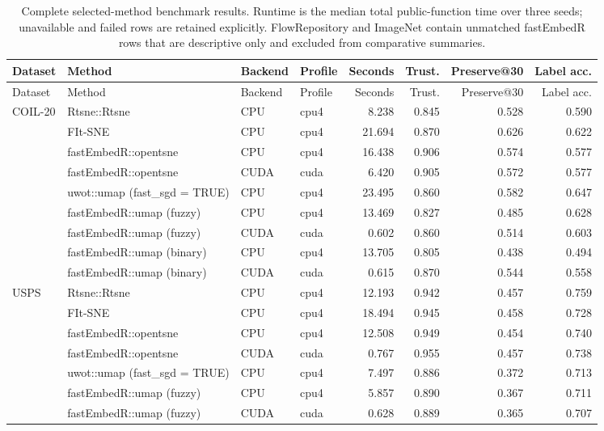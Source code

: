 {\scriptsize
\setlength{\tabcolsep}{2.2pt}
\begin{longtable}{p{}p{}llrrrr}
\caption{Complete selected-method benchmark results. Runtime is the median total public-function time over three seeds; unavailable and failed rows are retained explicitly. FlowRepository and ImageNet contain unmatched fastEmbedR rows that are descriptive only and excluded from comparative summaries.}\label{tab:allselected}\\
\toprule
Dataset & Method & Backend & Profile & Seconds & Trust. & Preserve@30 & Label acc.\\
\midrule
\endfirsthead
\toprule
Dataset & Method & Backend & Profile & Seconds & Trust. & Preserve@30 & Label acc.\\
\midrule
\endhead
COIL-20 & Rtsne::Rtsne & CPU & cpu4 & 8.238 & 0.845 & 0.528 & 0.590\\
 & FIt-SNE & CPU & cpu4 & 21.694 & 0.870 & 0.626 & 0.622\\
 & fastEmbedR::opentsne & CPU & cpu4 & 16.438 & 0.906 & 0.574 & 0.577\\
 & fastEmbedR::opentsne & CUDA & cuda & 6.420 & 0.905 & 0.572 & 0.577\\
 & uwot::umap (fast\_sgd = TRUE) & CPU & cpu4 & 23.495 & 0.860 & 0.582 & 0.647\\
 & fastEmbedR::umap (fuzzy) & CPU & cpu4 & 13.469 & 0.827 & 0.485 & 0.628\\
 & fastEmbedR::umap (fuzzy) & CUDA & cuda & 0.602 & 0.860 & 0.514 & 0.603\\
 & fastEmbedR::umap (binary) & CPU & cpu4 & 13.705 & 0.805 & 0.438 & 0.494\\
 & fastEmbedR::umap (binary) & CUDA & cuda & 0.615 & 0.870 & 0.544 & 0.558\\
\addlinespace[2pt]
USPS & Rtsne::Rtsne & CPU & cpu4 & 12.193 & 0.942 & 0.457 & 0.759\\
 & FIt-SNE & CPU & cpu4 & 18.494 & 0.945 & 0.458 & 0.728\\
 & fastEmbedR::opentsne & CPU & cpu4 & 12.508 & 0.949 & 0.454 & 0.740\\
 & fastEmbedR::opentsne & CUDA & cuda & 0.767 & 0.955 & 0.457 & 0.738\\
 & uwot::umap (fast\_sgd = TRUE) & CPU & cpu4 & 7.497 & 0.886 & 0.372 & 0.713\\
 & fastEmbedR::umap (fuzzy) & CPU & cpu4 & 5.857 & 0.890 & 0.367 & 0.711\\
 & fastEmbedR::umap (fuzzy) & CUDA & cuda & 0.628 & 0.889 & 0.365 & 0.707\\

\end{longtable}}

